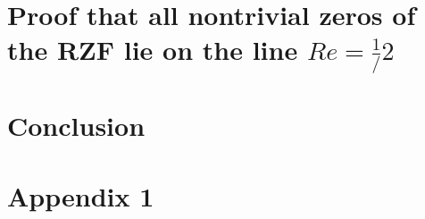 \documentclass[11pt, oneside]{article}   	%
\begin{document}
\section{Proof that all nontrivial zeros of the RZF lie on the line $Re = \frac{1}/{2}$}
\section{Conclusion}
\section{Appendix 1}
\end{document}
